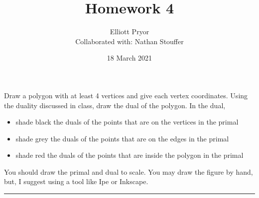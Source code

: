 \documentclass[11pt]{article}
\title{Homework 4}
\author{Elliott Pryor \\
Collaborated with: Nathan Stouffer}
\date{18 March 2021}
\begin{document}
\maketitle



Draw a polygon with at least 4 vertices and give each vertex coordinates.
Using the duality discussed in class, draw the dual of the polygon.  In the
dual,
\begin{itemize}
    \item shade black the duals of the points that are on the vertices in the primal
    \item shade grey the duals of the points that are on the edges in the primal
    \item shade red the duals of the points that are inside the polygon in the primal
\end{itemize}

You should draw the primal and dual to scale.  You may draw the figure by hand,
but, I suggest using a tool like Ipe or Inkscape.
\hrule
\end{document}
